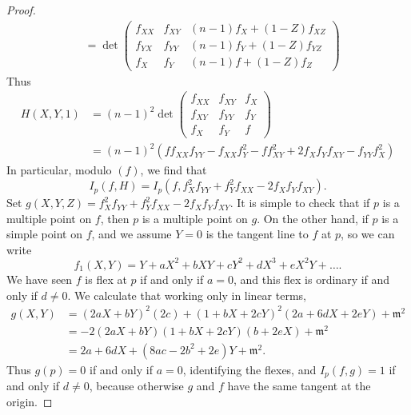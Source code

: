 \begin{proof}
\begin{align*}
        &= \det \begin{pmatrix} f_{XX} & f_{XY} & (n-1)f_X + (1-Z)f_{XZ} \\ f_{YX} & f_{YY} & (n-1)f_Y + (1-Z)f_{YZ} \\ f_X & f_Y & (n-1)f + (1-Z)f_Z \end{pmatrix}
    \end{align*}
    Thus
    \begin{align*}
        H(X,Y,1) &= (n-1)^2 \det \begin{pmatrix} f_{XX} & f_{XY} & f_X \\ f_{XY} & f_{YY} & f_Y \\ f_X & f_Y & f \end{pmatrix}\\
        &= (n-1)^2( f f_{XX}f_{YY} - f_{XX}f_Y^2 - f f_{XY}^2 + 2 f_Xf_Y f_{XY} - f_{YY}f_X^2)
    \end{align*}
    In particular, modulo $(f)$, we find that
    \[ I_p(f,H) = I_p(f,f_X^2 f_{YY} + f_Y^2 f_{XX} - 2 f_X f_Y f_{XY}). \]
    Set $g(X,Y,Z) = f_X^2 f_{YY} + f_Y^2 f_{XX} - 2f_X f_Y f_{XY}$. It is simple to check that if $p$ is a multiple point on $f$, then $p$ is a multiple point on $g$. On the other hand, if $p$ is a simple point on $f$, and we assume $Y = 0$ is the tangent line to $f$ at $p$, so we can write
    \[ f_1(X,Y) = Y + aX^2 + bXY + cY^2 + dX^3 + eX^2Y + \dots. \]
    We have seen $f$ is flex at $p$ if and only if $a = 0$, and this flex is ordinary if and only if $d \neq 0$. We calculate that working only in linear terms,
    \begin{align*}
        g(X,Y) &= (2aX + bY)^2 (2c) + (1 + bX + 2cY)^2(2a + 6dX + 2eY) + \mathfrak{m}^2\\
        &= - 2(2aX + bY)(1 + bX + 2cY)(b + 2eX) + \mathfrak{m}^2\\
        &= 2a + 6dX + (8ac - 2b^2 + 2e)Y + \mathfrak{m}^2.
    \end{align*}
    Thus $g(p) = 0$ if and only if $a = 0$, identifying the flexes, and $I_p(f,g) = 1$ if and only if $d \neq 0$, because otherwise $g$ and $f$ have the same tangent at the origin.
\end{proof}

